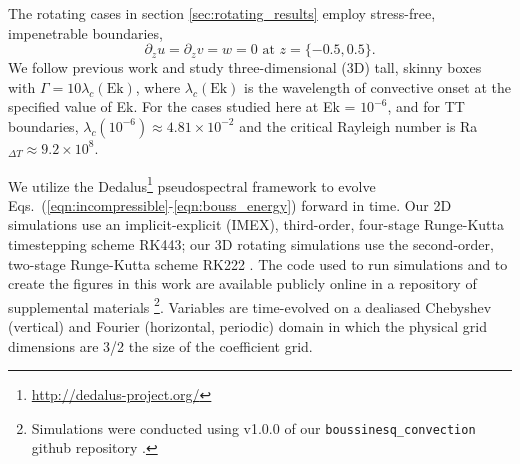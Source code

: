\documentclass[aps, pre, onecolumn, nofootinbib, notitlepage, groupedaddress, amsfonts, amssymb, amsmath, longbibliography, superscriptaddress]{revtex4-1}
\begin{document}
The rotating cases in section \ref{sec:rotating_results} employ stress-free, impenetrable boundaries,
\begin{equation}
\partial_z u = \partial_z v = w = 0 \, \, \text{at}\,\,z = \{-0.5, 0.5\}.
\label{eqn:vel_bcs}
\end{equation}
We follow previous work  \cite{stellmach&all2014} and study three-dimensional (3D) tall, skinny boxes with $\Gamma = 10\lambda_c(\text{Ek})$, where $\lambda_c(\text{Ek})$ is the wavelength of convective onset at the specified value of Ek. 
For the cases studied here at Ek = $10^{-6}$, and for TT boundaries, $\lambda_c(10^{-6}) \approx 4.81 \times 10^{-2}$ and the critical Rayleigh number is Ra$_{\Delta T} \approx 9.2 \times 10^{8}$.

We utilize the Dedalus\footnote{\url{http://dedalus-project.org/}} pseudospectral framework \cite{burns&all2016, burns&all2019} to evolve Eqs.~(\ref{eqn:incompressible}-\ref{eqn:bouss_energy}) forward in time.
Our 2D simulations use an implicit-explicit (IMEX), third-order, four-stage Runge-Kutta timestepping scheme RK443; our 3D rotating simulations use the second-order, two-stage Runge-Kutta scheme RK222 \cite{ascher&all1997}. 
The code used to run simulations and to create the figures in this work are available publicly online in a repository of supplemental materials \cite{anders&all2020a_supp}\footnote{Simulations were conducted using v1.0.0 of our \texttt{boussinesq\_convection} github repository \cite{code:boussinesq_convection}.}.
Variables are time-evolved on a dealiased Chebyshev (vertical) and Fourier (horizontal, periodic) domain in which the physical grid dimensions are 3/2 the size of the coefficient grid.  
\end{document}
